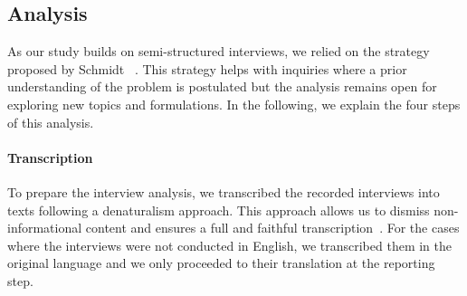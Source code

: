 \begin{table}
\vspace{-0.5em}
\centering
\caption{A summary of participants' profiles.}
\label{tab:participants}
\end{table}

\subsection{Analysis}
As our study builds on semi-structured interviews, we relied on the strategy proposed by Schmidt \etal~\cite{schmidt2004analysis}.
This strategy helps with inquiries where a prior understanding of the problem is postulated but the analysis remains open for exploring new topics and formulations.
In the following, we explain the four steps of this analysis.
\paragraph{Transcription}
To prepare the interview analysis, we transcribed the recorded interviews into texts following a denaturalism approach.
This approach allows us to dismiss non-informational content and ensures a full and faithful transcription~\cite{oliver2005constraints}.
For the cases where the interviews were not conducted in English, we transcribed them in the original language and we only proceeded to their translation at the reporting step.

